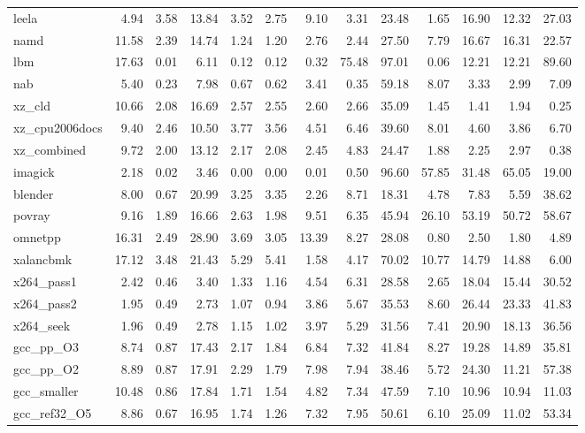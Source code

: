 \documentclass[10pt,a4paper]{article}
\begin{document}
{\begin{longtable}{@{}lrrrrrrrrrrrr@{}}
leela & 4.94 & 3.58 & 13.84 & 3.52 & 2.75 & 9.10 & 3.31 & 23.48 & 1.65 & 16.90 & 12.32 & 27.03 \\
namd & 11.58 & 2.39 & 14.74 & 1.24 & 1.20 & 2.76 & 2.44 & 27.50 & 7.79 & 16.67 & 16.31 & 22.57 \\
lbm & 17.63 & 0.01 & 6.11 & 0.12 & 0.12 & 0.32 & 75.48 & 97.01 & 0.06 & 12.21 & 12.21 & 89.60 \\
nab & 5.40 & 0.23 & 7.98 & 0.67 & 0.62 & 3.41 & 0.35 & 59.18 & 8.07 & 3.33 & 2.99 & 7.09 \\
xz\_cld & 10.66 & 2.08 & 16.69 & 2.57 & 2.55 & 2.60 & 2.66 & 35.09 & 1.45 & 1.41 & 1.94 & 0.25 \\
xz\_cpu2006docs & 9.40 & 2.46 & 10.50 & 3.77 & 3.56 & 4.51 & 6.46 & 39.60 & 8.01 & 4.60 & 3.86 & 6.70 \\
xz\_combined & 9.72 & 2.00 & 13.12 & 2.17 & 2.08 & 2.45 & 4.83 & 24.47 & 1.88 & 2.25 & 2.97 & 0.38 \\
imagick & 2.18 & 0.02 & 3.46 & 0.00 & 0.00 & 0.01 & 0.50 & 96.60 & 57.85 & 31.48 & 65.05 & 19.00 \\
blender & 8.00 & 0.67 & 20.99 & 3.25 & 3.35 & 2.26 & 8.71 & 18.31 & 4.78 & 7.83 & 5.59 & 38.62 \\
povray & 9.16 & 1.89 & 16.66 & 2.63 & 1.98 & 9.51 & 6.35 & 45.94 & 26.10 & 53.19 & 50.72 & 58.67 \\
omnetpp & 16.31 & 2.49 & 28.90 & 3.69 & 3.05 & 13.39 & 8.27 & 28.08 & 0.80 & 2.50 & 1.80 & 4.89 \\
xalancbmk & 17.12 & 3.48 & 21.43 & 5.29 & 5.41 & 1.58 & 4.17 & 70.02 & 10.77 & 14.79 & 14.88 & 6.00 \\
x264\_pass1 & 2.42 & 0.46 & 3.40 & 1.33 & 1.16 & 4.54 & 6.31 & 28.58 & 2.65 & 18.04 & 15.44 & 30.52 \\
x264\_pass2 & 1.95 & 0.49 & 2.73 & 1.07 & 0.94 & 3.86 & 5.67 & 35.53 & 8.60 & 26.44 & 23.33 & 41.83 \\
x264\_seek & 1.96 & 0.49 & 2.78 & 1.15 & 1.02 & 3.97 & 5.29 & 31.56 & 7.41 & 20.90 & 18.13 & 36.56 \\
gcc\_pp\_O3 & 8.74 & 0.87 & 17.43 & 2.17 & 1.84 & 6.84 & 7.32 & 41.84 & 8.27 & 19.28 & 14.89 & 35.81 \\
gcc\_pp\_O2 & 8.89 & 0.87 & 17.91 & 2.29 & 1.79 & 7.98 & 7.94 & 38.46 & 5.72 & 24.30 & 11.21 & 57.38 \\
gcc\_smaller & 10.48 & 0.86 & 17.84 & 1.71 & 1.54 & 4.82 & 7.34 & 47.59 & 7.10 & 10.96 & 10.94 & 11.03 \\
gcc\_ref32\_O5 & 8.86 & 0.67 & 16.95 & 1.74 & 1.26 & 7.32 & 7.95 & 50.61 & 6.10 & 25.09 & 11.02 & 53.34 \\

\end{longtable}}
\end{document}
